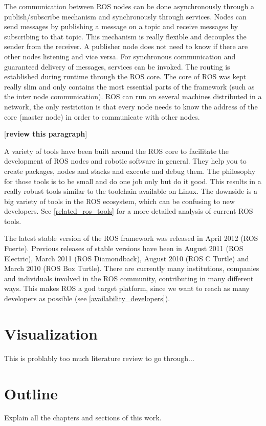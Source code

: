 The communication between ROS nodes can be done asynchronously through a publish/subscribe mechanism and synchronously through services. Nodes can send messages by publishing a message on a topic and receive messages by subscribing to that topic. This mechanism is really flexible and decouples the sender from the receiver. A publisher node does not need to know if there are other nodes listening and vice versa. For synchronous communication and guaranteed delivery of messages, services can be invoked. The routing is established during runtime through the ROS core. The core of ROS was kept really slim and only contains the most essential parts of the framework (such as the inter node communication). ROS can run on several machines distributed in a network, the only restriction is that every node needs to know the address of the core (master node) in order to communicate with other nodes.

[\textbf{review this paragraph}]

A variety of tools have been built around the ROS core to facilitate the development of ROS nodes and robotic software in general. They help you to create packages, nodes and stacks and execute and debug them. The philosophy for those tools is to be small and do one job only but do it good. This results in a really robust tools similar to the toolchain available on Linux. The downside is a big variety of tools in the ROS ecosystem, which can be confusing to new developers. See \ref{related_ros_tools} for a more detailed analysis of current ROS tools.

The latest stable version of the ROS framework was released in April 2012 (ROS Fuerte). Previous releases of stable versions have been in August 2011 (ROS Electric), March 2011 (ROS Diamondback), August 2010 (ROS C Turtle) and March 2010 (ROS Box Turtle). There are currently many institutions, companies and individuals involved in the ROS community, contributing in many different ways. This makes ROS a god target platform, since we want to reach as many developers as possible (see \ref{availability_developers}).

\section{Visualization}
This is problably too much literature review to go through...

\section{Outline}
Explain all the chapters and sections of this work.
